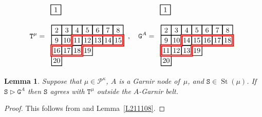 \documentclass[twoside,11pt,reqno]{amsart}
\numberwithin{equation}{section}
\newtheorem{Lemma}[equation]{Lemma}
\theoremstyle{definition}  %
\DeclareMathOperator\gdom {\triangleright}
\DeclareMathOperator\gedom{\trianglerighteq}
\newcommand{\St}{\operatorname{St}}
\newcommand{\Stab}{\operatorname{Stab}}
\newcommand{\0}{{\bar 0}}
\newcommand{\1}{{\bar 1}}
\newcommand\Par[1][]{{\mathscr P}^{\kappa#1}}
\def\T{{\mathtt T}}
\def\Stab{{\mathtt S}}
\def\G{{\mathtt G}}
\def\Gar{{\operatorname{Gar}}}
\newcommand\Tableau[2][\relax]{
  \begin{tikzpicture}[scale=0.5,draw/.append style={thick,black}]
    \ifx\relax#1\relax%
    \else %
      \foreach\box in {#1} { \filldraw[blue!30]\box+(-.5,-.5)rectangle++(.5,.5); }
    \fi
    \newcount\row\newcount\col
    \row=0
    \foreach \Row in {#2} {
       \col=1
       \foreach\k in \Row {
          \draw(\the\col,\the\row)+(-.5,-.5)rectangle++(.5,.5);
          \draw(\the\col,\the\row)node{\k};
          \global\advance\col by 1
       }
       \global\advance\row by -1
    }
  \end{tikzpicture}
}
\begin{document}
$$
\T^\mu=\begin{array}{l}
\Tableau{{1}}\\[10pt]
\begin{tikzpicture}[scale=0.5,draw/.append style={thick,black}]
  \newcount\col
  \foreach\Row/\row in {{2,3,4,5,6,7,8}/0,{9,10,11,12,13,14,15}/-1,{16,17,18,19}/-2,{20}/-3} {
     \col=1
     \foreach\k in \Row {
        \draw(\the\col,\row)+(-.5,-.5)rectangle++(.5,.5);
        \draw(\the\col,\row)node{\k};
        \global\advance\col by 1
      }
   }
   \draw[red,double,very thick]
     (2.5,-0.5)--++(5,0)--++(0,-1)--++(-4,0)--++(0,-1)--++(-3,0)--++(0,1)--++(2,0)--cycle;
\end{tikzpicture}
\end{array},\quad
\G^A=\begin{array}{l}
\Tableau{{1}}\\[10pt]
\begin{tikzpicture}[scale=0.5,draw/.append style={thick,black}]
  \newcount\col
  \foreach\Row/\row in {{2,3,4,5,6,7,8}/0,{9,10,14,15,16,17,18}/-1,{11,12,13,19}/-2,{20}/-3} {
     \col=1
     \foreach\k in \Row {
        \draw(\the\col,\row)+(-.5,-.5)rectangle++(.5,.5);
        \draw(\the\col,\row)node{\k};
        \global\advance\col by 1
      }
   }
   \draw[red,double,very thick]
     (2.5,-0.5)--++(5,0)--++(0,-1)--++(-4,0)--++(0,-1)--++(-3,0)--++(0,1)--++(2,0)--cycle;
\end{tikzpicture}
\end{array}$$



\begin{Lemma}\label{LAgrees} %
Suppose that $\mu\in\Par$, $A$ is a Garnir node of~$\mu$, and $\Stab\in\St(\mu)$.
If $\Stab\gdom\G^A$ then $\Stab$ agrees with $\T^\mu$ outside the $A$-Garnir belt. 

\end{Lemma}
\begin{proof}
This follows from \cite[Lemma 3.9]{BKW} and  Lemma~\ref{L211108}. 
\end{proof}

\end{document}
